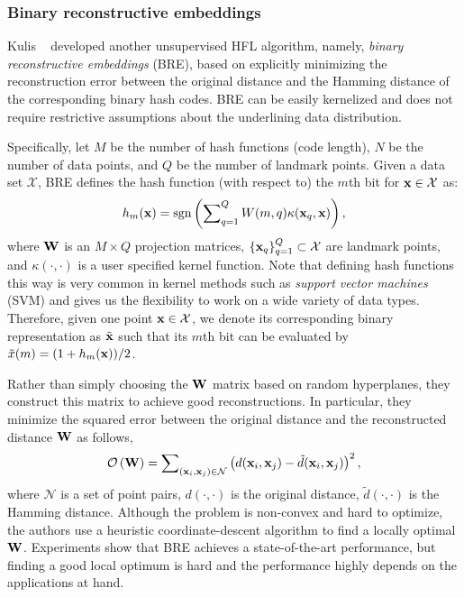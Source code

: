 \subsubsection{Binary reconstructive embeddings}
Kulis \etal~\cite{kulis2009nips} developed another unsupervised \mbox{HFL} algorithm, namely, \textit{binary reconstructive embeddings} (\mbox{BRE}), based on explicitly minimizing the reconstruction error between the original distance and the Hamming distance of the corresponding binary hash codes. \mbox{BRE} can be easily kernelized and does not require restrictive assumptions about the underlining data distribution.

Specifically, let $M$ be the number of hash functions (\aka code length), $N$ be the number of data points, and $Q$ be the number of landmark points. Given a data set $\mathcal{X}$, \mbox{BRE} defines the hash function \wrt (with respect to) the $m$th bit for ${\bf x}\in\mathcal{X}$ as:
\begin{align}
h_{m}({\bf x}) = \mathop{\rm sgn}\left(\sum\nolimits_{q=1}\nolimits^{Q}W(m,q)\kappa({\bf x}_q,{\bf x})\right),\nonumber
\end{align}
where ${\bf W}$ is an $M\times Q$ projection matrices, $\{{\bf x}_q\}_{q=1}^{Q}\subset\mathcal{X}$ are landmark points, and $\kappa(\cdot,\cdot)$ is a user specified kernel function. Note that defining hash functions this way is very common in kernel methods such as \textit{support vector machines} (\mbox{SVM}) and gives us the flexibility to work on a wide variety of data types. Therefore, given one point ${\bf x}\in\mathcal{X}$, we denote its corresponding binary representation as $\tilde{{\bf x}}$ such that its $m$th bit can be evaluated by $\tilde{x}(m) = (1+h_{m}({\bf x}))/2$.

Rather than simply choosing the $ {\bf W} $ matrix based on random hyperplanes, they construct this matrix to achieve good reconstructions. In particular, they minimize the squared error between the original distance and the reconstructed distance \wrt $ {\bf W} $ as follows,
\begin{align}
\mathcal{O}\left({\bf W}\right)=\sum\nolimits_{({\bf x}_i,{\bf x}_j)\in\mathcal{N}}\left(d({\bf x}_i,{\bf x}_j)-\tilde{d}({\bf x}_i,{\bf x}_j)\right)^{2},\nonumber
\end{align}
where $\mathcal{N}$ is a set of point pairs, $ d(\cdot,\cdot) $ is the original distance, $ \tilde{d}(\cdot,\cdot) $ is the Hamming distance. Although the problem is non-convex and hard to optimize, the authors use a heuristic coordinate-descent algorithm to find a locally optimal $ {\bf W} $. Experiments show that \mbox{BRE} achieves a state-of-the-art performance, but finding a good local optimum is hard and the performance highly depends on the applications at hand.

